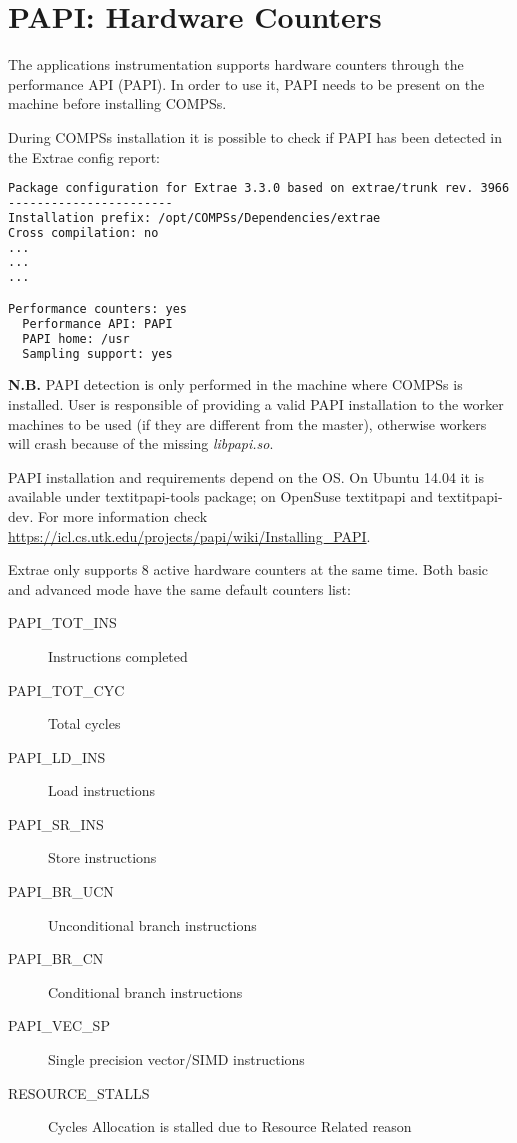 \section{PAPI: Hardware Counters}
\label{sec:papi}

The applications instrumentation supports hardware counters through the performance API (PAPI). In order to use it, PAPI needs to be present on the machine before installing
COMPSs. 

During COMPSs installation it is possible to check if PAPI has been detected in the Extrae config report:

\begin{lstlisting}[language=bash]
Package configuration for Extrae 3.3.0 based on extrae/trunk rev. 3966:
-----------------------
Installation prefix: /opt/COMPSs/Dependencies/extrae
Cross compilation: no
...
...
...

Performance counters: yes
  Performance API: PAPI
  PAPI home: /usr
  Sampling support: yes
\end{lstlisting}

\textbf{N.B.} PAPI detection is only performed in the machine where COMPSs is installed. User is responsible of providing a valid PAPI installation to the worker machines to be used (if they are different from the master), otherwise workers will crash because of the missing \textit{libpapi.so}. 


PAPI installation and requirements depend on the OS. On Ubuntu 14.04 it is available under textit{papi-tools} package; on OpenSuse textit{papi} and textit{papi-dev}.
For more information check \url{https://icl.cs.utk.edu/projects/papi/wiki/Installing_PAPI}.


Extrae only supports 8 active hardware counters at the same time. Both basic and advanced mode have the same default counters list:

\begin{description}
 \item [PAPI\_TOT\_INS] Instructions completed
 \item [PAPI\_TOT\_CYC] Total cycles
 \item [PAPI\_LD\_INS] Load instructions
 \item [PAPI\_SR\_INS] Store instructions
 \item [PAPI\_BR\_UCN] Unconditional branch instructions
 \item [PAPI\_BR\_CN] Conditional branch instructions
 \item [PAPI\_VEC\_SP] Single precision vector/SIMD instructions
 \item [RESOURCE\_STALLS] Cycles Allocation is stalled due to Resource Related reason
\end{description}

